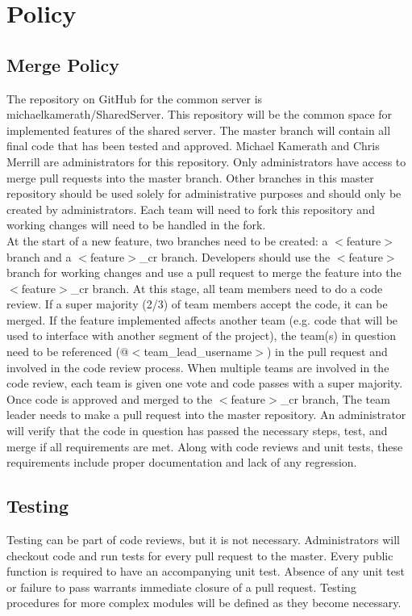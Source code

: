 \section*{Policy}
\subsection*{Merge Policy}
The repository on GitHub for the common server is michaelkamerath/SharedServer. This repository will be the common space for implemented features of the shared server. The master branch will contain all final code that has been tested and approved. Michael Kamerath and Chris Merrill are administrators for this repository. Only administrators have access to merge pull requests into the master branch. Other branches in this master repository should be used solely for administrative purposes and should only be created by administrators. Each team will need to fork this repository and working changes will need to be handled in the fork.\\
At the start of a new feature, two branches need to be created: a $<$feature$>$ branch and a $<$feature$>$\_cr branch. Developers should use the $<$feature$>$ branch for working changes and use a pull request to merge the feature into the $<$feature$>$\_cr branch. At this stage, all team members need to do a code review. If a super majority (2/3) of team members accept the code, it can be merged. If the feature implemented affects another team (e.g. code that will be used to interface with another segment of the project), the team(s) in question need to be referenced (@$<$team\_lead\_username$>$) in the pull request and involved in the code review process. When multiple teams are involved in the code review, each team is given one vote and code passes with a super majority.\\
Once code is approved and merged to the $<$feature$>$\_cr branch, The team leader needs to make a pull request into the master repository. An administrator will verify that the code in question has passed the necessary steps, test, and merge if all requirements are met. Along with code reviews and unit tests, these requirements include proper documentation and lack of any regression.\\
\subsection*{Testing}
Testing can be part of code reviews, but it is not necessary. Administrators will checkout code and run tests for every pull request to the master. Every public function is required to have an accompanying unit test. Absence of any unit test or failure to pass warrants immediate closure of a pull request. Testing procedures for more complex modules will be defined as they become necessary.\pagebreak
